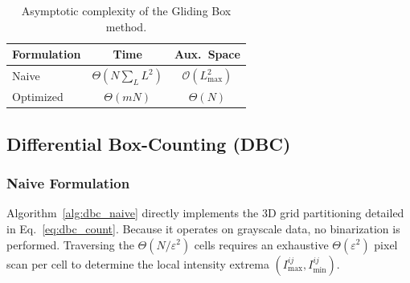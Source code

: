 \begin{table}[h]
\centering
\caption{Asymptotic complexity of the Gliding Box method.}
\label{tab:gb_complexity}
\begin{tabular}{lcc}
\hline
\textbf{Formulation} & \textbf{Time} & \textbf{Aux.\ Space} \\
\hline
Naive     & $\Theta\!\left(N\!\sum_{L}L^{2}\right)$ & $\mathcal{O}(L_{\max}^{2})$ \\
Optimized & $\Theta(mN)$ & $\Theta(N)$ \\
\hline
\end{tabular}
\end{table}

\begin{table}[h]
\centering
\caption{BC vs.\ GB optimized formulations (per scale).}
\label{tab:bc_gb_comparison}
\end{table}

\subsection{Differential Box-Counting (DBC)}
\label{subsec:dbc}

\subsubsection{Naive Formulation}

Algorithm~\ref{alg:dbc_naive} directly implements the 3D grid partitioning detailed in Eq.~\eqref{eq:dbc_count}. Because it operates on grayscale data, no binarization is performed. Traversing the $\Theta(N/\varepsilon^2)$ cells requires an exhaustive $\Theta(\varepsilon^2)$ pixel scan per cell to determine the local intensity extrema $(I^{ij}_{\max}, I^{ij}_{\min})$.

